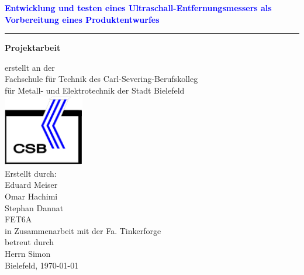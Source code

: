 \begin{center}
\begin{Huge}
\textcolor{blue}{\textbf{Entwicklung und testen eines Ultraschall-Entfernungsmessers als Vorbereitung eines Produktentwurfes}}
\end{Huge}
\rule{\textwidth}{.4pt}
\vspace{1.5cm}

\huge{\textbf{Projektarbeit}}\\
\begin{Large}
erstellt an der\\
Fachschule für Technik des Carl-Severing-Berufskolleg\\
für Metall- und Elektrotechnik der Stadt Bielefeld\\
\includegraphics[width=100pt]{Abbildungen/CSBlogo.png}\\

Erstellt durch:\\
\vspace{12pt}
Eduard Meiser\\Omar Hachimi \\Stephan Dannat\\FET6A\\
\vspace{12pt}
in Zusammenarbeit mit der Fa. Tinkerforge\\
betreut durch\\
Herrn Simon\\
Bielefeld, \today
\end{Large}
\end{center}
